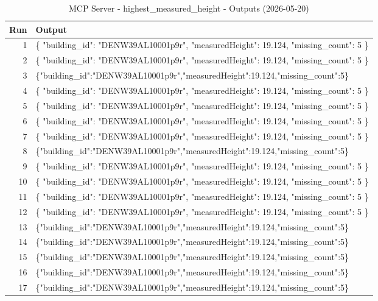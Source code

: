 \documentclass[a4paper,11pt]{article}
\begin{document}
\clearpage

\begin{table}[ht]
\centering
\scriptsize
\caption{MCP Server - highest\_measured\_height - Outputs (2026-05-20)}
\label{tab:mcp\_highest\_measured\_height\_outputs\_2026-05-20}
\begin{tabular}{r p{12cm}}
\hline
Run & Output \\
\hline
1 & \{
  "building\_id": "DENW39AL10001p9r",
  "measuredHeight": 19.124,
  "missing\_count": 5
\} \\
2 & \{
  "building\_id": "DENW39AL10001p9r",
  "measuredHeight": 19.124,
  "missing\_count": 5
\} \\
3 & \{"building\_id":"DENW39AL10001p9r","measuredHeight":19.124,"missing\_count":5\} \\
4 & \{
  "building\_id": "DENW39AL10001p9r",
  "measuredHeight": 19.124,
  "missing\_count": 5
\} \\
5 & \{
  "building\_id": "DENW39AL10001p9r",
  "measuredHeight": 19.124,
  "missing\_count": 5
\} \\
6 & \{
  "building\_id": "DENW39AL10001p9r",
  "measuredHeight": 19.124,
  "missing\_count": 5
\} \\
7 & \{
  "building\_id": "DENW39AL10001p9r",
  "measuredHeight": 19.124,
  "missing\_count": 5
\} \\
8 & \{"building\_id":"DENW39AL10001p9r","measuredHeight":19.124,"missing\_count":5\} \\
9 & \{
  "building\_id": "DENW39AL10001p9r",
  "measuredHeight": 19.124,
  "missing\_count": 5
\} \\
10 & \{
  "building\_id": "DENW39AL10001p9r",
  "measuredHeight": 19.124,
  "missing\_count": 5
\} \\
11 & \{
  "building\_id": "DENW39AL10001p9r",
  "measuredHeight": 19.124,
  "missing\_count": 5
\} \\
12 & \{
  "building\_id": "DENW39AL10001p9r",
  "measuredHeight": 19.124,
  "missing\_count": 5
\} \\
13 & \{"building\_id":"DENW39AL10001p9r","measuredHeight":19.124,"missing\_count":5\} \\
14 & \{"building\_id":"DENW39AL10001p9r","measuredHeight":19.124,"missing\_count":5\} \\
15 & \{"building\_id":"DENW39AL10001p9r","measuredHeight":19.124,"missing\_count":5\} \\
16 & \{"building\_id":"DENW39AL10001p9r","measuredHeight":19.124,"missing\_count":5\} \\
17 & \{"building\_id":"DENW39AL10001p9r","measuredHeight":19.124,"missing\_count":5\} \\

\end{tabular}
\end{table}
\end{document}
